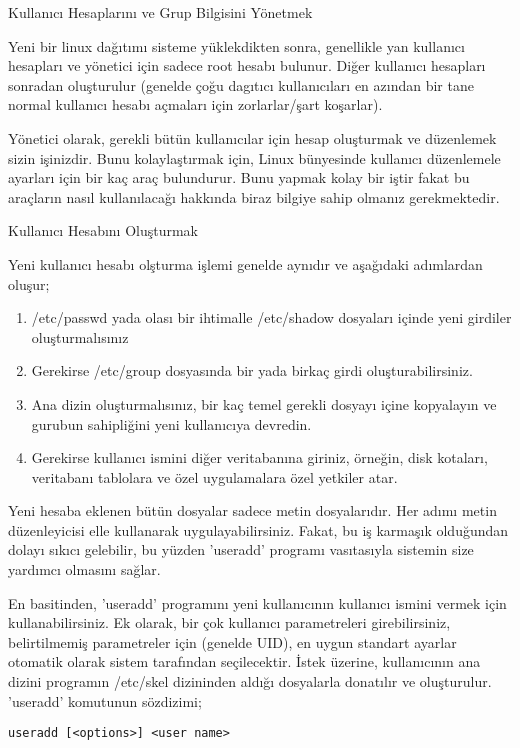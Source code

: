 \begin{section}{Kullanıcı Hesaplarını ve Grup Bilgisini Yönetmek}

Yeni bir linux dağıtımı sisteme yüklekdikten sonra, genellikle yan kullanıcı hesapları ve yönetici için sadece root hesabı bulunur. Diğer kullanıcı hesapları sonradan oluşturulur (genelde çoğu dagıtıcı kullanıcıları en azından bir tane normal kullanıcı hesabı açmaları için zorlarlar/şart koşarlar).

Yönetici olarak, gerekli bütün kullanıcılar için hesap oluşturmak ve düzenlemek sizin işinizdir. Bunu kolaylaştırmak için, Linux bünyesinde kullanıcı düzenlemele ayarları için bir kaç araç bulundurur. Bunu yapmak kolay bir iştir fakat bu araçların nasıl kullanılacağı hakkında biraz bilgiye sahip olmanız gerekmektedir.
\begin{subsection}{Kullanıcı Hesabını Oluşturmak}

Yeni kullanıcı hesabı olşturma işlemi genelde aynıdır ve aşağıdaki adımlardan oluşur;
\begin{enumerate}
\item /etc/passwd yada olası bir ihtimalle /etc/shadow dosyaları içinde yeni girdiler oluşturmalısınız
\item Gerekirse /etc/group dosyasında bir yada birkaç girdi oluşturabilirsiniz.
\item Ana dizin oluşturmalısınız, bir kaç temel gerekli dosyayı içine kopyalayın ve gurubun sahipliğini yeni kullanıcıya devredin.
\item Gerekirse kullanıcı ismini diğer veritabanına giriniz, örneğin, disk kotaları, veritabanı tablolara ve özel uygulamalara özel yetkiler atar.
\end{enumerate}

Yeni hesaba eklenen bütün dosyalar sadece metin dosyalarıdır. Her adımı metin düzenleyicisi elle kullanarak uygulayabilirsiniz. Fakat, bu iş karmaşık olduğundan dolayı sıkıcı gelebilir, bu yüzden 'useradd' programı vasıtasıyla sistemin size yardımcı olmasını sağlar.

En basitinden, 'useradd' programını yeni kullanıcının kullanıcı ismini vermek için kullanabilirsiniz. Ek olarak, bir çok kullanıcı parametreleri girebilirsiniz, belirtilmemiş parametreler için (genelde UID), en uygun standart ayarlar otomatik olarak sistem tarafından seçilecektir. İstek üzerine, kullanıcının ana dizini programın /etc/skel dizininden aldığı dosyalarla donatılır ve oluşturulur. 'useradd' komutunun sözdizimi;
\begin{verbatim}
useradd [<options>] <user name>
\end{verbatim}


\end{subsection}
\end{section}
